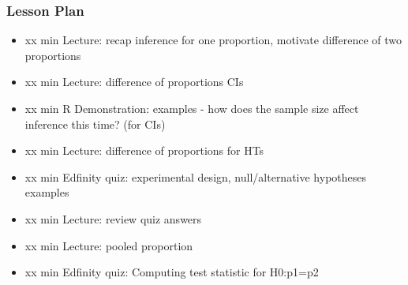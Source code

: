 \begin{frame}
    \frametitle{Lesson Plan}
    \begin{itemize}
        \item xx min Lecture: recap inference for one proportion, motivate difference of two proportions
        \item xx min Lecture: difference of proportions CIs
        \item xx min R Demonstration: examples - how does the sample size affect inference this time? (for CIs)
        \item xx min Lecture: difference of proportions for HTs
        \item xx min Edfinity quiz: experimental design, null/alternative hypotheses examples
        \item xx min Lecture: review quiz answers
        \item xx min Lecture: pooled proportion
        \item xx min Edfinity quiz: Computing test statistic for H0:p1=p2
    \end{itemize}
\end{frame}
            
